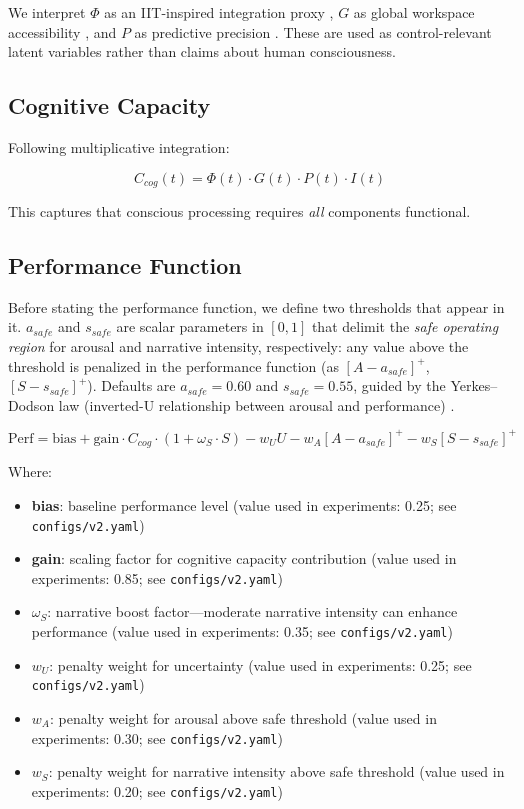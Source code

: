 \documentclass{article}
\begin{document}
We interpret $\Phi$ as an IIT-inspired integration proxy \cite{Tononi2008}, $G$ as global workspace accessibility \cite{Baars1988}, and $P$ as predictive precision \cite{Friston2010}. These are used as control-relevant latent variables rather than claims about human consciousness.

\subsection{Cognitive Capacity}

Following multiplicative integration:

\begin{equation}
C_{cog}(t) = \Phi(t) \cdot G(t) \cdot P(t) \cdot I(t)
\end{equation}

This captures that conscious processing requires \textit{all} components functional.

\subsection{Performance Function}

Before stating the performance function, we define two thresholds that appear in it. $a_{safe}$ and $s_{safe}$ are scalar parameters in $[0,1]$ that delimit the \emph{safe operating region} for arousal and narrative intensity, respectively: any value above the threshold is penalized in the performance function (as $[A-a_{safe}]^+$, $[S-s_{safe}]^+$). Defaults are $a_{safe}=0.60$ and $s_{safe}=0.55$, guided by the Yerkes--Dodson law (inverted-U relationship between arousal and performance) \cite{Yerkes1908,Hebb1955}.

\begin{equation}\label{eq:perf}
\text{Perf} = \text{bias} + \text{gain} \cdot C_{cog} \cdot (1 + \omega_S \cdot S) - w_U U - w_A [A - a_{safe}]^+ - w_S [S - s_{safe}]^+
\end{equation}

Where:
\begin{itemize}
    \item \textbf{bias}: baseline performance level (value used in experiments: 0.25; see \texttt{configs/v2.yaml})
    \item \textbf{gain}: scaling factor for cognitive capacity contribution (value used in experiments: 0.85; see \texttt{configs/v2.yaml})
    \item \textbf{$\omega_S$}: narrative boost factor---moderate narrative intensity can enhance performance (value used in experiments: 0.35; see \texttt{configs/v2.yaml})
    \item \textbf{$w_U$}: penalty weight for uncertainty (value used in experiments: 0.25; see \texttt{configs/v2.yaml})
    \item \textbf{$w_A$}: penalty weight for arousal above safe threshold (value used in experiments: 0.30; see \texttt{configs/v2.yaml})
    \item \textbf{$w_S$}: penalty weight for narrative intensity above safe threshold (value used in experiments: 0.20; see \texttt{configs/v2.yaml})
\end{itemize}
\end{document}
